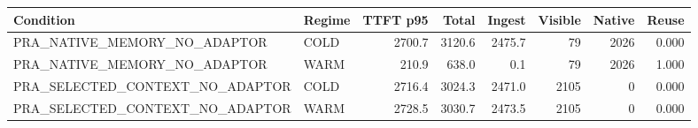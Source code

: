 \begin{tabular}{llrrrrrr}
\toprule
Condition & Regime & TTFT p95 & Total & Ingest & Visible & Native & Reuse \\
\midrule
PRA\_NATIVE\_MEMORY\_NO\_ADAPTOR & COLD & 2700.7 & 3120.6 & 2475.7 & 79 & 2026 & 0.000 \\
PRA\_NATIVE\_MEMORY\_NO\_ADAPTOR & WARM & 210.9 & 638.0 & 0.1 & 79 & 2026 & 1.000 \\
PRA\_SELECTED\_CONTEXT\_NO\_ADAPTOR & COLD & 2716.4 & 3024.3 & 2471.0 & 2105 & 0 & 0.000 \\
PRA\_SELECTED\_CONTEXT\_NO\_ADAPTOR & WARM & 2728.5 & 3030.7 & 2473.5 & 2105 & 0 & 0.000 \\
\bottomrule
\end{tabular}
